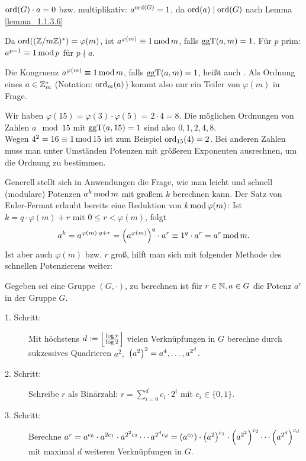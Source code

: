\begin{folg}
	$\ord(G) \cdot a = 0$ bzw. multiplikativ: $a^{\ord(G)} = 1$, da $\ord(a) \mid \ord(G)$ nach Lemma \ref{lemma_1.1.3.6}
\end{folg}

\begin{folg}
	Da $\ord((\ZZ/m\ZZ)^*) = \varphi(m)$, ist $a^{\varphi(m)} \kon 1 \modu m$, falls $\ggT(a,m)=1$. 
	Für $p$ prim: $a^{p-1} \kon 1 \modu p$ für $p \nmid a$. 
\end{folg}

\begin{bem}
	Die Kongruenz $a^{\varphi(m)} \kon 1 \modu m$, falls $\ggT(a,m)=1$, heißt auch . 
	Als Ordnung eines $a \in \ZZ_m^*$ (Notation: $\ord_m(a)$) kommt also nur ein Teiler von $\varphi(m)$ in Frage.
\end{bem}

\begin{bsp}
	Wir haben $\varphi(15) = \varphi(3) \cdot \varphi(5)$ = $2 \cdot 4 = 8$. 
	Die möglichen Ordnungen von Zahlen $a \mod 15$ mit $\ggT(a,15)=1$  sind also $0,1,2,4,8$.\\
	Wegen $4^2 = 16 \kon 1 \modu 15$ ist zum Beispiel $\ord_{15}(4) = 2$. 
	Bei anderen Zahlen muss man unter Umständen Potenzen mit größeren Exponenten ausrechnen, um die Ordnung zu bestimmen.
\end{bsp}

Generell stellt sich in Anwendungen die Frage, wie man leicht und schnell (modulare) Potenzen $a^k \modu m$ mit großem $k$ berechnen kann. 
Der Satz von Euler-Fermat erlaubt bereits eine Reduktion von $k \modu \varphi(m)$: Ist\linebreak
$k = q \cdot \varphi(m) + r$ mit $0 \leq r < \varphi(m)$, folgt
\[ a^k = a^{\varphi(m) \cdot q + r} = \enbrace*{a^{\varphi(m)}}^q \cdot a^r \kon 1^q \cdot a^r = a^r \modu m.\]
Ist aber auch $\varphi(m)$ bzw. $r$ groß, hilft man sich mit folgender Methode des schnellen Potenzierens weiter:

\begin{lemma}
	Gegeben sei eine Gruppe $(G,\cdot)$, zu berechnen ist für $r \in \NN, a \in G$ die Potenz $a^r$ in der Gruppe $G$. 
	\begin{description}
		\item[1. Schritt:] Mit höchstens $d := \floor*{\frac{\log r}{\log 2}}$ vielen Verknüpfungen in $G$ berechne durch sukzessives Quadrieren $a^2,$\linebreak
		$\enbrace*{a^2}^2 = a^4, \dots, a^{2^d}$.
		\item[2. Schritt:] Schreibe $r$ als Binärzahl: $r = \sum_{i=0}^d c_i \cdot 2^i$ mit $c_i \in \{0,1\}$.
		\item[3. Schritt:] Berechne $a^r = a^{c_0} \cdot a^{2c_1} \cdot a^{2^2 c_2} \cdots a^{2^d c_d} = \enbrace*{a^{c_0}} \cdot \enbrace*{a^2}^{c_1} \cdot \enbrace*{a^{2^2}}^{c_2} \cdots \enbrace*{a^{2^d}}^{c_d}$ mit maximal $d$ weiteren Verknüpfungen in $G$. 
		\end{description}
\end{lemma}

